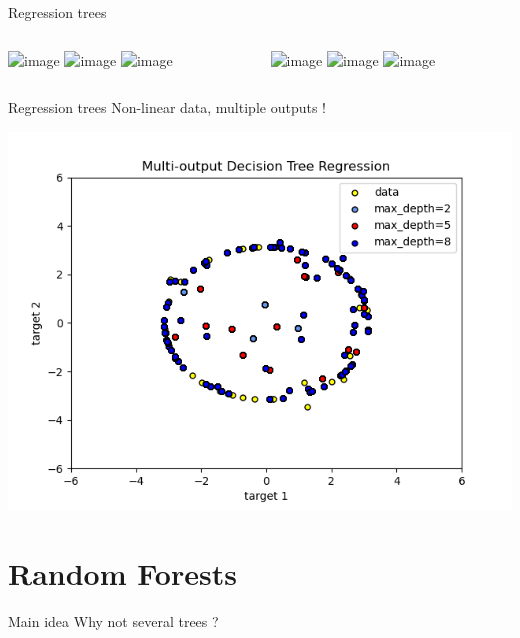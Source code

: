 \documentclass{irdbeamer}
\begin{document}
\begin{frame}{Regression trees}
\begin{columns}
    \begin{column}[t]{0.5\textwidth}
\centering
    \includegraphics<1>[width=\textwidth]{./figs/regression.png}%
    \includegraphics<2>[width=\textwidth]{./figs/regression2.png}%
    \includegraphics<3>[width=\textwidth]{./figs/regression3.png}%
\end{column}
    \begin{column}[t]{0.5\textwidth}
\centering
    \includegraphics<1>[width=\textwidth]{./figs/regression_tree.png}%
    \includegraphics<2>[width=\textwidth]{./figs/regression_tree2.png}%
    \includegraphics<3>[width=\textwidth]{./figs/regression_tree3.png}%
\end{column}
\end{columns}
\end{frame}

\begin{frame}{Regression trees}
\centering
Non-linear data, multiple outputs !

    \includegraphics[width=.5\textwidth]{./figs/non-linear.png}%
\end{frame}


\section{Random Forests}

\begin{frame}{Main idea}
    \centering
    Why not several trees ?
\end{frame}
\end{document}
